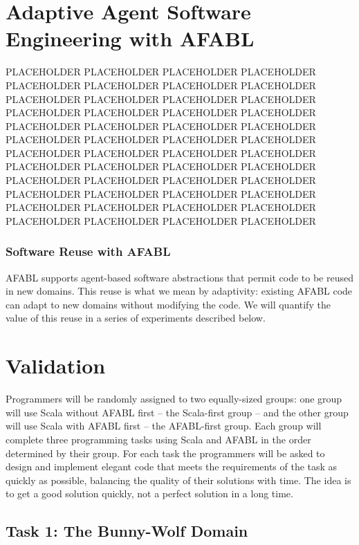 \section{Adaptive Agent Software Engineering with AFABL}

PLACEHOLDER PLACEHOLDER PLACEHOLDER PLACEHOLDER PLACEHOLDER PLACEHOLDER PLACEHOLDER PLACEHOLDER PLACEHOLDER PLACEHOLDER PLACEHOLDER PLACEHOLDER PLACEHOLDER PLACEHOLDER PLACEHOLDER PLACEHOLDER PLACEHOLDER PLACEHOLDER PLACEHOLDER PLACEHOLDER PLACEHOLDER PLACEHOLDER PLACEHOLDER PLACEHOLDER PLACEHOLDER PLACEHOLDER PLACEHOLDER PLACEHOLDER PLACEHOLDER PLACEHOLDER PLACEHOLDER PLACEHOLDER PLACEHOLDER PLACEHOLDER PLACEHOLDER PLACEHOLDER PLACEHOLDER PLACEHOLDER PLACEHOLDER PLACEHOLDER PLACEHOLDER PLACEHOLDER PLACEHOLDER PLACEHOLDER PLACEHOLDER PLACEHOLDER PLACEHOLDER PLACEHOLDER


\subsubsection{Software Reuse with AFABL}

AFABL supports agent-based software abstractions that permit code to be reused in new domains.  This reuse is what we mean by adaptivity: existing AFABL code can adapt to new domains without modifying the code.  We will quantify the value of this reuse in a series of
experiments described below.

\section{Validation}

Programmers will be randomly assigned to two equally-sized groups: one group will use Scala without AFABL first -- the Scala-first group -- and the other group will use Scala with AFABL first -- the AFABL-first group.  Each group will complete three programming tasks using Scala and AFABL in the order determined by their group.  For each task the programmers will be asked to design and implement elegant code that meets the requirements of the task as quickly as possible, balancing the quality of their solutions with time.  The idea is to get a good solution quickly, not a perfect solution in a long time.

\subsection{Task 1: The Bunny-Wolf Domain}\label{sec:task1}

